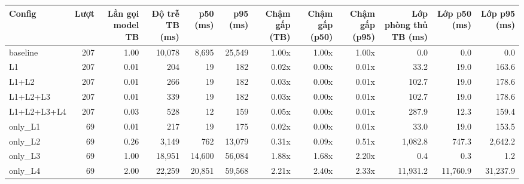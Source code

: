 \begin{tabular}{lrrrrrrrrrrr}
\toprule
Config & Lượt & Lần gọi model TB & Độ trễ TB (ms) & p50 (ms) & p95 (ms) & Chậm gấp (TB) & Chậm gấp (p50) & Chậm gấp (p95) & Lớp phòng thủ TB (ms) & Lớp p50 (ms) & Lớp p95 (ms) \\
\midrule
baseline & 207 & 1.00 & 10,078 & 8,695 & 25,549 & 1.00x & 1.00x & 1.00x & 0.0 & 0.0 & 0.0 \\
L1 & 207 & 0.01 & 204 & 19 & 182 & 0.02x & 0.00x & 0.01x & 33.2 & 19.0 & 163.6 \\
L1+L2 & 207 & 0.01 & 266 & 19 & 182 & 0.03x & 0.00x & 0.01x & 102.7 & 19.0 & 178.6 \\
L1+L2+L3 & 207 & 0.01 & 339 & 19 & 182 & 0.03x & 0.00x & 0.01x & 102.7 & 19.0 & 178.6 \\
L1+L2+L3+L4 & 207 & 0.03 & 528 & 12 & 159 & 0.05x & 0.00x & 0.01x & 287.9 & 12.3 & 159.4 \\
only\_L1 & 69 & 0.01 & 217 & 19 & 175 & 0.02x & 0.00x & 0.01x & 33.0 & 19.0 & 153.5 \\
only\_L2 & 69 & 0.26 & 3,149 & 762 & 13,079 & 0.31x & 0.09x & 0.51x & 1,082.8 & 747.3 & 2,642.2 \\
only\_L3 & 69 & 1.00 & 18,951 & 14,600 & 56,084 & 1.88x & 1.68x & 2.20x & 0.4 & 0.3 & 1.2 \\
only\_L4 & 69 & 2.00 & 22,259 & 20,851 & 59,568 & 2.21x & 2.40x & 2.33x & 11,931.2 & 11,760.9 & 31,237.9 \\
\bottomrule
\end{tabular}
